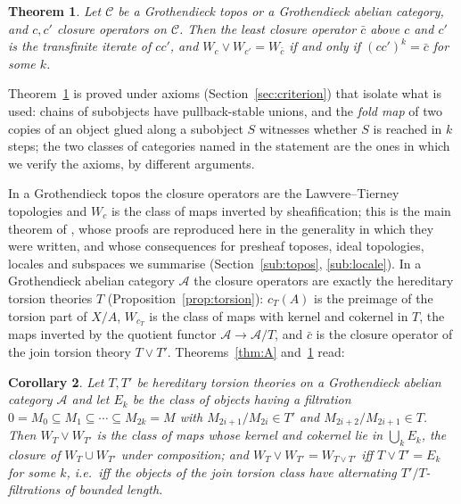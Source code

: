 \documentclass[11pt]{amsart}
\newtheorem{thm}{Theorem}[section]
\newtheorem{cor}[thm]{Corollary}
\theoremstyle{definition}
\newcommand{\cC}{\mathcal C}
\begin{document}
\begin{thm}\label{thm:B}
Let $\cC$ be a Grothendieck topos or a Grothendieck abelian category, and
$c,c'$ closure operators on $\cC$. Then the least closure operator $\bar c$
above $c$ and $c'$ is the transfinite iterate of $cc'$, and
$W_c\vee W_{c'}=W_{\bar c}$ if and only if $(cc')^k=\bar c$ for some $k$.
\end{thm}

Theorem~\ref{thm:B} is proved under axioms (Section~\ref{sec:criterion})
that isolate what is used: chains of subobjects have pullback-stable
unions, and the \emph{fold map} of two copies of an object glued along a
subobject $S$ witnesses whether $S$ is reached in $k$ steps; the two classes
of categories named in the statement are the ones in which we verify the
axioms, by different arguments.

In a Grothendieck topos the closure operators are the Lawvere--Tierney
topologies and $W_c$ is the class of maps inverted by sheafification; this is
the main theorem of \cite{Stabjoin}, whose proofs are reproduced here in the
generality in which they were written, and whose consequences for
presheaf toposes, ideal topologies, locales and subspaces we summarise
(Section~\ref{sub:topos}, \ref{sub:locale}). In a Grothendieck abelian
category $\mathcal A$ the closure operators are exactly the hereditary
torsion theories $T$ (Proposition~\ref{prop:torsion}): $c_T(A)$ is the
preimage of the torsion part of $X/A$, $W_{c_T}$ is the class of maps with
kernel and cokernel in $T$, the maps inverted by the quotient functor
$\mathcal A\to\mathcal A/T$, and $\bar c$ is the closure operator of the join
torsion theory $T\vee T'$. Theorems~\ref{thm:A} and~\ref{thm:B} read:

\begin{cor}\label{cor:abelian}
Let $T,T'$ be hereditary torsion theories on a Grothendieck abelian category
$\mathcal A$ and let $E_k$ be the class of objects having a filtration
$0=M_0\subseteq M_1\subseteq\cdots\subseteq M_{2k}=M$ with $M_{2i+1}/M_{2i}
\in T'$ and $M_{2i+2}/M_{2i+1}\in T$. Then $W_T\vee W_{T'}$ is the class of
maps whose kernel and cokernel lie in $\bigcup_kE_k$, the closure of
$W_T\cup W_{T'}$ under composition; and $W_T\vee W_{T'}=W_{T\vee T'}$ iff
$T\vee T'=E_k$ for some $k$, i.e.\ iff the objects of the join torsion class
have alternating $T'/T$-filtrations of bounded length.
\end{cor}
\end{document}
